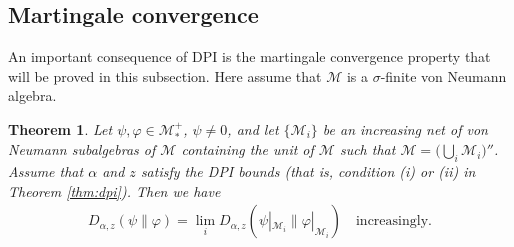 \documentclass[12pt]{article}
\newtheorem{theorem}{Theorem}[section]
\theoremstyle{definition}
\theoremstyle{remark}
\numberwithin{equation}{section}
\def\cM{\mathcal M}
\def\Me{\mathcal M}
\def\ffi{\varphi}
\begin{document}
\subsection{Martingale convergence}

An important consequence of DPI is the martingale convergence property that will be
proved in this {subsection. Here assume that $\cM$ is a $\sigma$-finite von Neumann algebra.}

\begin{theorem}\label{thm:martingale}
Let $\psi,\varphi\in \Me_*^+$, $\psi\ne 0$, and let $\{\cM_i\}$ be an increasing net of von Neumann
subalgebras of $\cM$ containing the unit of $\cM$ such that $\cM=\bigl(\bigcup_i\cM_i\bigr)''$.
Assume that $\alpha$ and $z$ satisfy the DPI bounds (that is, condition (i) or (ii) in
Theorem \ref{thm:dpi}). Then we have
\begin{align}\label{eq:martingale}
D_{\alpha,z}(\psi\|\ffi)=\lim_iD_{\alpha,z}(\psi|_{\cM_i}\|\ffi|_{\cM_i})
\quad\mbox{increasingly}.
\end{align}
\end{theorem}
\end{document}
